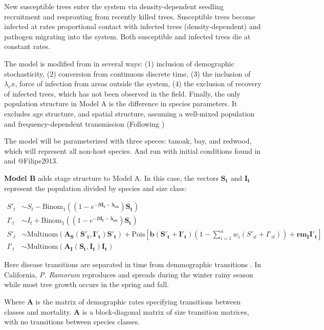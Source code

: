 \documentclass[english,nohyper,nofonts,nobib,nols,twoside]{tufte-handout}
\renewcommand\citep\cite
\let\oldcitet\citet
\renewcommand{\citet}[1]{\oldcitet{#1}\cite{#1}}
\begin{document}
New susceptible trees enter the system via density-dependent seedling
recruitment and resprouting from recently killed trees. Susceptible
trees become infected at rates proportional contact with infected trees
(density-dependent) and pathogen migrating into the system. Both
susceptible and infected trees die at constant rates.

The model is modified from \citet{Cobb2012} in several ways: (1)
inclusion of demographic stochasticity, (2) conversion from continuous
discrete time, (3) the inclusion of $\lambda_ex$, force of infection
from areas outside the system, (4) the exclusion of recovery of infected
trees, which has not been observed in the field. Finally, the only
population structure in Model A is the difference in species parameters.
It excludes age structure, and spatial structure, assuming a well-mixed
population and frequency-dependent transmission (Following
\citet{Diekmann1990})

The model will be parameterized with three speces: tanoak, bay, and
redwood, which will represent all non-host species. And run with initial
conditions found in \citet{Cobb2012} and @Filipe2013.

\textbf{Model B} adds stage structure to Model A. In this case, the
vectors $\boldsymbol{S_t}$ and $\boldsymbol{I_t}$ represent the
population divided by species and size class:

\[\begin{aligned}
S'_t &\sim S_t - \text{Binom}_1\left((1 - e^{-\boldsymbol{\beta I_t} - \boldsymbol{\lambda_{ex}}})\boldsymbol{S_t} \right) \\
I'_t &\sim I_t + \text{Binom}_1\left((1 - e^{-\boldsymbol{\beta I_t} - \boldsymbol{\lambda_{ex}}})\boldsymbol{S_t} \right) \\
S'_t &\sim \text{Multinom}(\boldsymbol{A_S(S'_t,I'_t)S'_t}) + \text{Pois}\left[\boldsymbol{b(S'_t+I'_t)}\left(1-\sum_{i=1}^n w_i (S'_{it} + I'_{it}) \right) + \boldsymbol{rm_I I'_t}\right] \\
I'_t &\sim \text{Multinom}(\boldsymbol{A_I(S_t,I_t)I_t})
\end{aligned}\]

Here disease transitions are separated in time from demmographic
transitions \citep{Klepac2010}. In California, \emph{P. Ramorum}
reproduces and spreads during the winter rainy season while most tree
growth occurs in the spring and fall.

Where $\boldsymbol{A}$ is the matrix of demographic rates specifying
transitions between classes and mortality. $\boldsymbol{A}$ is a
block-diagonal matrix of size transition matrices, with no transitions
between species classes.
\end{document}
